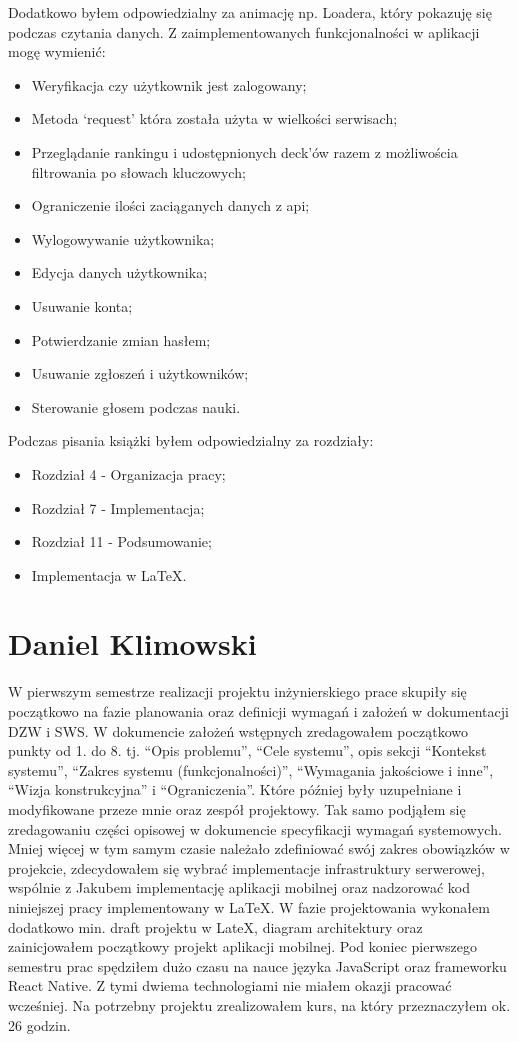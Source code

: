 Dodatkowo byłem odpowiedzialny za animację np. Loadera, który pokazuję się podczas czytania danych.
Z zaimplementowanych funkcjonalności w aplikacji mogę wymienić:

\begin{itemize}
    \item Weryfikacja czy użytkownik jest zalogowany;
    \item Metoda ‘request’ która została użyta w wielkości serwisach;
    \item Przeglądanie rankingu i udostępnionych deck’ów razem z możliwościa filtrowania po słowach kluczowych;
    \item Ograniczenie ilości zaciąganych danych z api;
    \item Wylogowywanie użytkownika;
    \item Edycja danych użytkownika;
    \item Usuwanie konta;
    \item Potwierdzanie zmian hasłem;
    \item Usuwanie zgłoszeń i użytkowników;
    \item Sterowanie głosem podczas nauki.
\end{itemize}

Podczas pisania książki byłem odpowiedzialny za rozdziały:

\begin{itemize}
    \item Rozdział 4 - Organizacja pracy;
    \item Rozdział 7 - Implementacja;
    \item Rozdział 11 - Podsumowanie;
    \item Implementacja w LaTeX.
\end{itemize}

\section{Daniel Klimowski}

W pierwszym semestrze realizacji projektu inżynierskiego prace skupiły się początkowo na fazie planowania oraz
definicji wymagań i założeń w dokumentacji DZW i SWS. W dokumencie założeń wstępnych zredagowałem początkowo punkty
od 1. do 8. tj. “Opis problemu”, “Cele systemu”, opis sekcji “Kontekst systemu”, “Zakres systemu (funkcjonalności)”,
“Wymagania jakościowe i inne”, “Wizja konstrukcyjna” i “Ograniczenia”. Które później były uzupełniane i modyfikowane
przeze mnie oraz zespół projektowy. Tak samo podjąłem się zredagowaniu części opisowej w dokumencie specyfikacji
wymagań systemowych. Mniej więcej w tym samym czasie należało zdefiniować swój zakres obowiązków w projekcie,
zdecydowałem się wybrać implementacje infrastruktury serwerowej, wspólnie z Jakubem implementację aplikacji mobilnej
oraz nadzorować kod niniejszej pracy implementowany w LaTeX. W fazie projektowania wykonałem dodatkowo min. draft
projektu w LateX, diagram architektury oraz zainicjowałem początkowy projekt aplikacji mobilnej. Pod koniec pierwszego
semestru prac spędziłem dużo czasu na nauce języka JavaScript oraz frameworku React Native. Z tymi dwiema technologiami
nie miałem okazji pracować wcześniej. Na potrzebny projektu zrealizowałem kurs, na który przeznaczyłem ok. 26 godzin.

